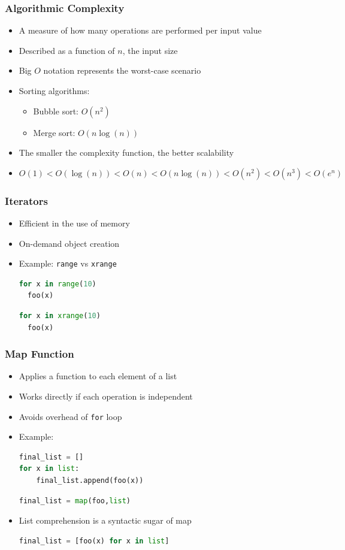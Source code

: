 \documentclass[xcolor=table,10pt,final]{beamer}
\begin{document}
\begin{frame}
	\frametitle{Algorithmic Complexity}
	\begin{itemize}
		\item A measure of how many operations are performed per input value
		\item Described as a function of $n$, the input size
		\item Big $O$ notation represents the worst-case scenario
		\item Sorting algorithms:
		\begin{itemize}
			\item Bubble sort: $O(n^2)$
			\item Merge sort: $O(n\log(n))$
		\end{itemize}
		\item The smaller the complexity function, the better scalability
		\item {\small $O(1)<O(\log(n))<O(n)<O(n\log(n))<O(n^2)<O(n^3)<O(e^n)$}
	\end{itemize}
\end{frame}

\begin{frame}[fragile]
	\frametitle{Iterators}
	\begin{itemize}
		\item Efficient in the use of memory
		\item On-demand object creation
		\item Example: {\tt range} vs {\tt xrange}
			\begin{lstlisting}[language=Python]
for x in range(10)
  foo(x)
			\end{lstlisting}
			\begin{lstlisting}[language=Python]
for x in xrange(10)
  foo(x)
			\end{lstlisting}
	\end{itemize}
\end{frame}

\begin{frame}[fragile]
	\frametitle{Map Function}
	\begin{itemize}
		\item Applies a function to each element of a list
		\item Works directly if each operation is independent
		\item Avoids overhead of {\tt for} loop
		\item Example:
			\begin{lstlisting}[language=Python]
final_list = []
for x in list:
    final_list.append(foo(x))
			\end{lstlisting}
			\begin{lstlisting}[language=Python]
final_list = map(foo,list)
			\end{lstlisting}
		\item List comprehension is a syntactic sugar of map
			\begin{lstlisting}[language=Python]
final_list = [foo(x) for x in list]
			\end{lstlisting}
	\end{itemize}
\end{frame}
\end{document}
